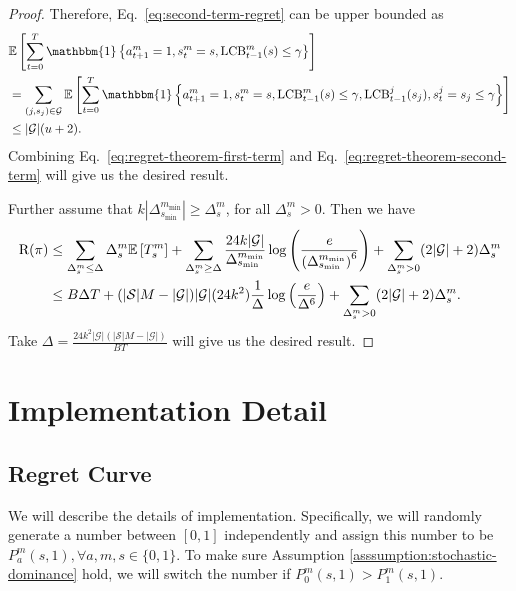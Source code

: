 \begin{proof}
Therefore, Eq.~\eqref{eq:second-term-regret} can be upper bounded as
\begin{align}
    &\E\left[\sum_{t=0}^T \mathbbm{1}\left\{a_{t+1}^m=1,s_t^m=s,\mathrm{LCB}_{t-1}^m(s)\leq \gamma\right\}\right]\notag\\
    &=\sum_{(j,s_j)\in\mathcal{G}}\E\left[\sum_{t=0}^T\mathbbm{1}\left\{a_{t+1}^m=1,s_t^m=s,\mathrm{LCB}_{t-1}^m(s)\leq\gamma,\mathrm{LCB}_{t-1}^j(s_j),s_t^j=s_j\leq \gamma\right\}\right]\notag\\
    &\leq |\mathcal{G}|(u+2).\label{eq:regret-theorem-second-term}
\end{align}
Combining Eq.~\eqref{eq:regret-theorem-first-term} and Eq.~\eqref{eq:regret-theorem-second-term} will give us the desired result.

Further assume that $k\left|\Delta_{s_{\min}}^{m_{\min}}\right|\geq \Delta_{s}^m$, for all $\Delta_s^m>0$. Then we have
\begin{align*}
    \mathrm{R}(\pi)&\leq \sum_{\Delta_s^m\leq \Delta} \Delta_s^m\mathbb{E}\left[T_s^m\right]+\sum_{\Delta_s^m \geq \Delta} \frac{24k|\mathcal{G}|}{\Delta_{s_{\min}}^{m_{\min}}}\log\left(\frac{e}{\left(\Delta_{s_{\min}}^{m_{\min}}\right)^6}\right)+\sum_{\Delta_s^m>0}(2|\mathcal{G}|+2)\Delta_s^m\\
    &\leq B\Delta T+(|\mathcal{S}|M-|\mathcal{G}|)|\mathcal{G}|(24k^2)\frac{1}{\Delta}\log\left(\frac{e}{\Delta^6}\right)+\sum_{\Delta_s^m>0}(2|\mathcal{G}|+2)\Delta_s^m.
\end{align*}
Take $\Delta=\frac{24k^2|\mathcal{G}|(|\mathcal{S}|M-|\mathcal{G}|)}{BT}$ will give us the desired result.
\end{proof}
\section{Implementation Detail}\label{sec:implementation-detail}
\subsection{Regret Curve}\label{subsec:implementation-detail-regret}
 We will describe the details of implementation. Specifically, we will randomly generate a number between $[0,1]$ independently and assign this number to be $P_{a}^m(s,1), \forall a,m,s\in\{0,1\}$. To make sure Assumption \ref{asssumption:stochastic-dominance} hold, we will switch the number if $P_0^m(s,1)>P_1^m(s,1)$.


